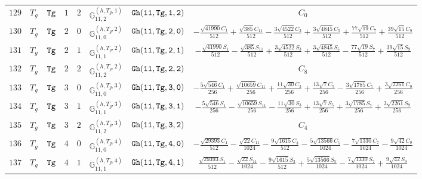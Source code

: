 \documentclass[fleqn,8pt]{jsarticle}
\begin{document}
\begin{table}[ht!]
\begin{center}
\begin{tabular}{cccccccc}
$ 129 $ & $ T_{g} $ & $ {\tt Tg} $ & $ 1 $ & $ 2 $ & $ \mathbb{G}_{11,2}^{(h,T_{g},1)} $ & $ {\tt Gh(11,Tg,1,2)} $ & $ C_{0} $ \\
$ 130 $ & $ T_{g} $ & $ {\tt Tg} $ & $ 2 $ & $ 0 $ & $ \mathbb{G}_{11,0}^{(h,T_{g},2)} $ & $ {\tt Gh(11,Tg,2,0)} $ & $ - \frac{\sqrt{41990} C_{1}}{512} + \frac{\sqrt{385} C_{11}}{512} - \frac{3 \sqrt{4522} C_{3}}{512} + \frac{3 \sqrt{4845} C_{5}}{512} + \frac{77 \sqrt{19} C_{7}}{512} + \frac{39 \sqrt{15} C_{9}}{512} $ \\
$ 131 $ & $ T_{g} $ & $ {\tt Tg} $ & $ 2 $ & $ 1 $ & $ \mathbb{G}_{11,1}^{(h,T_{g},2)} $ & $ {\tt Gh(11,Tg,2,1)} $ & $ - \frac{\sqrt{41990} S_{1}}{512} - \frac{\sqrt{385} S_{11}}{512} + \frac{3 \sqrt{4522} S_{3}}{512} + \frac{3 \sqrt{4845} S_{5}}{512} - \frac{77 \sqrt{19} S_{7}}{512} + \frac{39 \sqrt{15} S_{9}}{512} $ \\
$ 132 $ & $ T_{g} $ & $ {\tt Tg} $ & $ 2 $ & $ 2 $ & $ \mathbb{G}_{11,2}^{(h,T_{g},2)} $ & $ {\tt Gh(11,Tg,2,2)} $ & $ C_{8} $ \\
$ 133 $ & $ T_{g} $ & $ {\tt Tg} $ & $ 3 $ & $ 0 $ & $ \mathbb{G}_{11,0}^{(h,T_{g},3)} $ & $ {\tt Gh(11,Tg,3,0)} $ & $ - \frac{5 \sqrt{546} C_{1}}{256} + \frac{\sqrt{10659} C_{11}}{256} + \frac{11 \sqrt{30} C_{3}}{256} + \frac{13 \sqrt{7} C_{5}}{256} - \frac{3 \sqrt{1785} C_{7}}{256} + \frac{3 \sqrt{2261} C_{9}}{256} $ \\
$ 134 $ & $ T_{g} $ & $ {\tt Tg} $ & $ 3 $ & $ 1 $ & $ \mathbb{G}_{11,1}^{(h,T_{g},3)} $ & $ {\tt Gh(11,Tg,3,1)} $ & $ - \frac{5 \sqrt{546} S_{1}}{256} - \frac{\sqrt{10659} S_{11}}{256} - \frac{11 \sqrt{30} S_{3}}{256} + \frac{13 \sqrt{7} S_{5}}{256} + \frac{3 \sqrt{1785} S_{7}}{256} + \frac{3 \sqrt{2261} S_{9}}{256} $ \\
$ 135 $ & $ T_{g} $ & $ {\tt Tg} $ & $ 3 $ & $ 2 $ & $ \mathbb{G}_{11,2}^{(h,T_{g},3)} $ & $ {\tt Gh(11,Tg,3,2)} $ & $ C_{4} $ \\
$ 136 $ & $ T_{g} $ & $ {\tt Tg} $ & $ 4 $ & $ 0 $ & $ \mathbb{G}_{11,0}^{(h,T_{g},4)} $ & $ {\tt Gh(11,Tg,4,0)} $ & $ - \frac{\sqrt{29393} C_{1}}{512} - \frac{\sqrt{22} C_{11}}{1024} - \frac{9 \sqrt{1615} C_{3}}{512} - \frac{5 \sqrt{13566} C_{5}}{1024} - \frac{7 \sqrt{1330} C_{7}}{1024} - \frac{9 \sqrt{42} C_{9}}{1024} $ \\
$ 137 $ & $ T_{g} $ & $ {\tt Tg} $ & $ 4 $ & $ 1 $ & $ \mathbb{G}_{11,1}^{(h,T_{g},4)} $ & $ {\tt Gh(11,Tg,4,1)} $ & $ \frac{\sqrt{29393} S_{1}}{512} - \frac{\sqrt{22} S_{11}}{1024} - \frac{9 \sqrt{1615} S_{3}}{512} + \frac{5 \sqrt{13566} S_{5}}{1024} - \frac{7 \sqrt{1330} S_{7}}{1024} + \frac{9 \sqrt{42} S_{9}}{1024} $ \\

\end{tabular}
\end{center}
\end{table}
\end{document}
